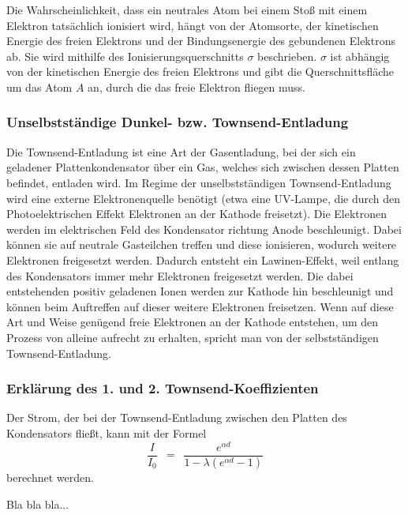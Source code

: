 \documentclass{article}
\newcommand{\widespace}{\enspace}
\newcommand{\wideeq}{\widespace = \widespace}
\begin{document}
Die Wahrscheinlichkeit, dass ein neutrales Atom bei einem Stoß mit einem Elektron
tatsächlich ionisiert wird, hängt von der Atomsorte, der kinetischen Energie des
freien Elektrons und der Bindungsenergie des gebundenen Elektrons ab.
Sie wird mithilfe des Ionisierungsquerschnitts $\sigma$ beschrieben.
$\sigma$ ist abhängig von der kinetischen Energie des freien Elektrons und gibt
die Querschnittsfläche um das Atom $A$ an, durch die das freie Elektron
fliegen muss.

\cite[34--35]{demtröder}


\subsubsection{Unselbstständige Dunkel- bzw. Townsend-Entladung}

Die Townsend-Entladung ist eine Art der Gasentladung, bei der sich ein geladener
Plattenkondensator über ein Gas, welches sich zwischen dessen Platten befindet,
entladen wird. Im Regime der unselbstständigen Townsend-Entladung
wird eine externe Elektronenquelle benötigt (etwa eine UV-Lampe, die durch den
Photoelektrischen Effekt Elektronen an der Kathode freisetzt).
Die Elektronen werden im elektrischen Feld des Kondensator richtung Anode
beschleunigt. Dabei können sie auf neutrale Gasteilchen treffen und diese
ionisieren, wodurch weitere Elektronen freigesetzt werden.
Dadurch entsteht ein Lawinen-Effekt, weil entlang des Kondensators immer mehr
Elektronen freigesetzt werden.
Die dabei entstehenden positiv geladenen Ionen werden zur Kathode hin beschleunigt
und können beim Auftreffen auf dieser weitere Elektronen freisetzen.
Wenn auf diese Art und Weise genügend freie Elektronen an der Kathode entstehen,
um den Prozess von alleine aufrecht zu erhalten, spricht man von der selbstständigen
Townsend-Entladung.

\cite[18--21]{koubek}


\subsubsection{Erklärung des 1. und 2. Townsend-Koeffizienten}

Der Strom, der bei der Townsend-Entladung zwischen den Platten des Kondensators
fließt, kann mit der Formel
\[
    \frac{I}{I_0} \wideeq
    \frac{
        e^{\alpha d}
    }{
        1 - \lambda (e^{\alpha d} - 1)
    }
\]
berechnet werden.

\cite[18--21]{koubek}

Bla bla bla...
\end{document}
